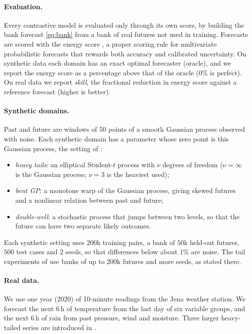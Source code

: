 \documentclass[11pt]{article}
\theoremstyle{plain}
\theoremstyle{definition}
\theoremstyle{remark}
\begin{document}
\paragraph{Evaluation.}
Every contrastive model is evaluated only through its own score, by building
the bank forecast \eqref{eq:bank} from a bank of real futures not used in
training. Forecasts are scored with the energy score \cite{gneiting2007strictly},
a proper scoring rule for multivariate probabilistic forecasts that rewards
both accuracy and calibrated uncertainty. On synthetic data each domain has
an exact optimal forecaster (oracle), and we report the energy score as a
percentage above that of the oracle ($0\%$ is perfect). On real data we report
\emph{skill}, the fractional reduction in energy score against a reference
forecast (higher is better).

\paragraph{Synthetic domains.}
Past and future are windows of $50$ points of a smooth Gaussian process
observed with noise. Each synthetic domain has a parameter whose zero point
is this Gaussian process, the setting of \cite{baptista2025mathematical}:
\begin{itemize}
 \item \emph{heavy tails}: an elliptical Student-$t$ process with $\nu$
       degrees of freedom ($\nu=\infty$ is the Gaussian process; $\nu=3$ is
       the heaviest used);
 \item \emph{bent GP}: a monotone warp of the Gaussian process, giving
       skewed futures and a nonlinear relation between past and future;
 \item \emph{double-well}: a stochastic process that jumps between two
       levels, so that the future can have two separate likely outcomes.
\end{itemize}
Each synthetic setting uses $200$k training pairs, a bank of $50$k held-out
futures, $500$ test cases and $2$ seeds, so that differences below about
$1\%$ are noise. The tail experiments of
use banks of up to $200$k futures and more seeds, as stated there.

\paragraph{Real data.}
We use one year (2020) of 10-minute readings from the Jena weather station. We
forecast the next 6\,h of temperature from the last day of six variable
groups, and the next 6\,h of rain from past pressure, wind and moisture.
Three larger heavy-tailed series are introduced in .
\end{document}
